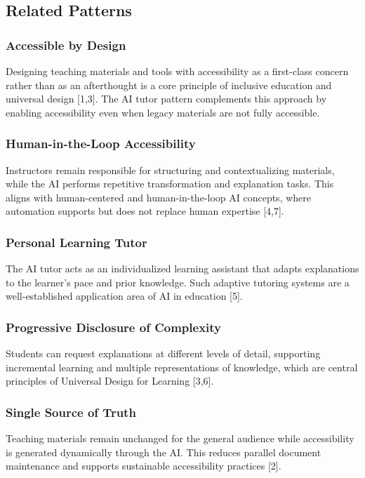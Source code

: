 \subsection*{Related Patterns}


\subsubsection*{Accessible by Design}
Designing teaching materials and tools with accessibility as a first-class concern rather than as an afterthought is a core principle of inclusive education and universal design [1,3]. The AI tutor pattern complements this approach by enabling accessibility even when legacy materials are not fully accessible.

\subsubsection*{Human-in-the-Loop Accessibility}
Instructors remain responsible for structuring and contextualizing materials, while the AI performs repetitive transformation and explanation tasks. This aligns with human-centered and human-in-the-loop AI concepts, where automation supports but does not replace human expertise [4,7].

\subsubsection*{Personal Learning Tutor}
The AI tutor acts as an individualized learning assistant that adapts explanations to the learner’s pace and prior knowledge. Such adaptive tutoring systems are a well-established application area of AI in education [5].

\subsubsection*{Progressive Disclosure of Complexity}
Students can request explanations at different levels of detail, supporting incremental learning and multiple representations of knowledge, which are central principles of Universal Design for Learning [3,6].

\subsubsection*{Single Source of Truth}
Teaching materials remain unchanged for the general audience while accessibility is generated dynamically through the AI. This reduces parallel document maintenance and supports sustainable accessibility practices [2].

